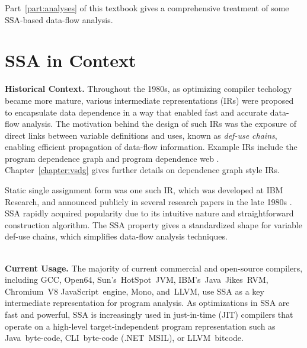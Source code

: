 Part~\ref{part:analyses} of this textbook gives a comprehensive treatment of 
some SSA-based data-flow analysis.






\section{SSA in Context}




\textbf{Historical Context. }
Throughout the 1980s, as optimizing compiler
techology became more mature, various intermediate
representations (IRs) were proposed to encapsulate data
dependence in a way that enabled fast and accurate
data-flow analysis.
The motivation behind the design of
such IRs was the exposure of direct links between variable
definitions and uses, known as \textit{def-use chains},
enabling efficient propagation of data-flow information.
Example IRs include the program dependence graph \cite{ferrante87program}
and program dependence web \cite{ottenstein90program}.
Chapter~\ref{chapter:vsdg} gives further details on dependence graph
style IRs.


Static single assignment form was one such IR, 
which was developed at IBM Research, and announced publicly
in several research papers in the late 1980s
\cite{rosen88global,alpern88detecting,cytron89efficient}.
SSA rapidly acquired popularity due to its 
intuitive nature and straightforward
construction algorithm.
The SSA property gives a 
standardized shape for variable def-use chains,
which simplifies data-flow analysis techniques.

~\\
\textbf{Current Usage. }
The majority of current commercial and open-source compilers, including  GCC, Open64, Sun's~HotSpot~JVM, IBM's~Java~Jikes~RVM, Chromium~V8 JavaScript~engine, Mono, and~LLVM,
use SSA as a key intermediate representation for
program analysis.
As optimizations in SSA are fast and powerful, SSA is increasingly used in
just-in-time (JIT) compilers that operate on a high-level target-independent
program representation such as Java~byte-code, CLI~byte-code (.NET~MSIL), or
LLVM~bitcode.


